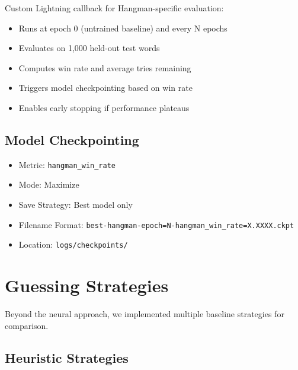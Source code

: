 \documentclass[12pt,a4paper]{article}
\begin{document}
Custom Lightning callback for Hangman-specific evaluation:
\begin{itemize}
    \item Runs at epoch 0 (untrained baseline) and every N epochs
    \item Evaluates on 1,000 held-out test words
    \item Computes win rate and average tries remaining
    \item Triggers model checkpointing based on win rate
    \item Enables early stopping if performance plateaus
\end{itemize}

\subsection{Model Checkpointing}

\begin{itemize}
    \item Metric: \texttt{hangman\_win\_rate}
    \item Mode: Maximize
    \item Save Strategy: Best model only
    \item Filename Format: \texttt{best-hangman-epoch=N-hangman\_win\_rate=X.XXXX.ckpt}
    \item Location: \texttt{logs/checkpoints/}
\end{itemize}

\section{Guessing Strategies}

Beyond the neural approach, we implemented multiple baseline strategies for comparison.

\subsection{Heuristic Strategies}
\end{document}
